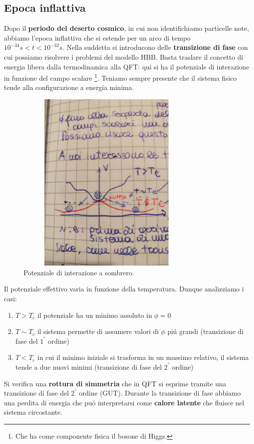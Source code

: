 \documentclass[12pt, a4paper]{article}
\begin{document}
\subsection{Epoca inflattiva}
Dopo il \textbf{periodo del deserto cosmico}, in cui non identifichiamo particelle note, abbiamo l'epoca inflattiva che si estende per un arco di tempo $10^{-34}s<t<10^{-32} s$. Nella suddetta si introducono delle \textbf{transizione di fase} con cui possiamo risolvere i problemi del modello HBB. Basta traslare il concetto di energia libera dalla termodinamica alla QFT: qui si ha il potenziale di interazione in funzione del campo scalare \footnote{Che ha come componente fisica il bosone di Higgs.}. Teniamo sempre presente che il sistema fisico tende alla configurazione a energia minima.
\begin{figure}[htp]
    \centering
    \includegraphics[width=9cm, height=9cm]{images/sombrero.jpeg}
    \caption{Potenziale di interazione a sombrero.}
    \label{fig:sombrero}
\end{figure}
Il potenziale effettivo varia in funzione della temperatura. Dunque analizziamo i casi:
\begin{enumerate}
\item $T>T_c$ il potenziale ha un minimo assoluto in $\phi=0$
\item $T \sim T_c$  il sistema permette di assumere valori di $\phi$ pi\'{u} grandi (transizione di fase del $1^°$ ordine)
\item $T<T_c$ in cui il minimo iniziale si trasforma in un massimo relativo, il sistema tende a due nuovi minimi (transizione di fase del $2^°$ ordine)
\end{enumerate}
Si verifica una \textbf{rottura di simmetria} che in QFT si esprime tramite una transizione di fase del $2^°$ ordine (GUT). Durante la transizione di fase abbiamo una perdita di energia che pu\'{o} interpretarsi come \textbf{calore latente} che fluisce nel sistema circostante.
\end{document}
